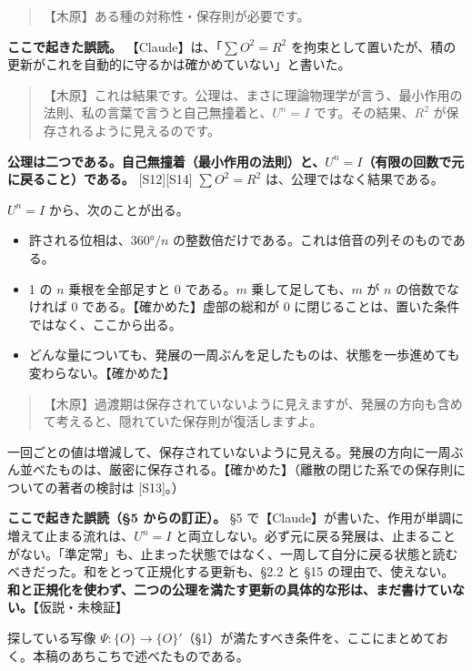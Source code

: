 \documentclass[
  a4paper,
]{ltjsarticle}
\providecommand{\tightlist}{%
  \setlength{\itemsep}{0pt}\setlength{\parskip}{0pt}}
\begin{document}
\begin{quote}
【木原】ある種の対称性・保存則が必要です。
\end{quote}

\textbf{ここで起きた誤読。} 【Claude】は、「\(\sum O^2 = R^2\)
を拘束として置いたが、積の更新がこれを自動的に守るかは確かめていない」と書いた。

\begin{quote}
【木原】これは結果です。公理は、まさに理論物理学が言う、最小作用の法則、私の言葉で言うと自己無撞着と、\(U^n = I\)
です。その結果、\(R^2\) が保存されるように見えるのです。
\end{quote}

\textbf{公理は二つである。自己無撞着（最小作用の法則）と、\(U^n = I\)（有限の回数で元に戻ること）である。}
{[}S12{]}{[}S14{]} \(\sum O^2 = R^2\) は、公理ではなく結果である。

\(U^n = I\) から、次のことが出る。

\begin{itemize}
\tightlist
\item
  許される位相は、\(360°/n\)
  の整数倍だけである。これは倍音の列そのものである。
\item
  1 の \(n\) 乗根を全部足すと 0 である。\(m\) 乗して足しても、\(m\) が
  \(n\) の倍数でなければ 0 である。【確かめた】虚部の総和が 0
  に閉じることは、置いた条件ではなく、ここから出る。
\item
  どんな量についても、発展の一周ぶんを足したものは、状態を一歩進めても変わらない。【確かめた】
\end{itemize}

\begin{quote}
【木原】過渡期は保存されていないように見えますが、発展の方向も含めて考えると、隠れていた保存則が復活しますよ。
\end{quote}

一回ごとの値は増減して、保存されていないように見える。発展の方向に一周ぶん並べたものは、厳密に保存される。【確かめた】（離散の閉じた系での保存則についての著者の検討は
{[}S13{]}。）

\textbf{ここで起きた誤読（§5 からの訂正）。} §5
で【Claude】が書いた、作用が単調に増えて止まる流れは、\(U^n = I\)
と両立しない。必ず元に戻る発展は、止まることがない。「準定常」も、止まった状態ではなく、一周して自分に戻る状態と読むべきだった。和をとって正規化する更新も、§2.2
と §15
の理由で、使えない。\textbf{和と正規化を使わず、二つの公理を満たす更新の具体的な形は、まだ書けていない。}【仮説・未検証】

探している写像
\(\Psi : \{O\} \to \{O\}'\)（§1）が満たすべき条件を、ここにまとめておく。本稿のあちこちで述べたものである。
\end{document}
